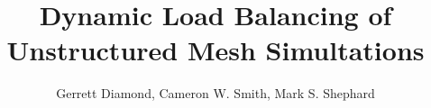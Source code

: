 \documentclass[sigconf]{acmart}
\begin{document}
\title{Dynamic Load Balancing of Unstructured Mesh Simultations}

\author{Gerrett Diamond, Cameron W. Smith, Mark S. Shephard}

\renewcommand{\shortauthors}{G. Diamond et al.}

\begin{abstract}
\end{abstract}


\maketitle





\end{document}
